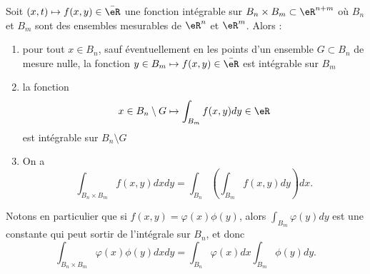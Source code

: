 \begin{theorem}[Fubini]\label{ThoFubini}
Soit $(x,t)\mapsto f(x,y)\in\bar \eR$ une fonction intégrable sur $B_n\times B_m\subset\eR^{n+m}$ où $B_n$ et $B_m$ sont des ensembles mesurables de $\eR^n$ et $\eR^m$. Alors :
\begin{enumerate}
\item pour tout $x\in B_n$, sauf éventuellement en les points d'un ensemble $G\subset B_n$ de mesure nulle, la fonction $y\in B_m\mapsto f(x,y)\in\bar\eR$ est intégrable sur $B_m$
\item
la fonction
\begin{equation}
	x\in B_n\setminus G\mapsto\int_{B_m}f(x,y)dy\in\eR
\end{equation}
est intégrable sur $B_n\setminus G$

\item 
On a
\begin{equation}
	\int_{B_n\times B_m}f(x,y)dxdy=\int_{B_n}\left( \int_{B_m}f(x,y)dy \right)dx.
\end{equation}

\end{enumerate}
\end{theorem}

Notons en particulier que si $f(x,y)=\varphi(x)\phi(y)$, alors $\int_{B_m}\varphi(y)dy$ est une constante qui peut sortir de l'intégrale sur $B_n$, et donc
\begin{equation}		\label{EqFubiniFactori}
	\int_{B_n\times B_m}\varphi(x)\phi(y)dxdy=\int_{B_n}\varphi(x)dx\int_{B_m}\phi(y)dy.
\end{equation}

